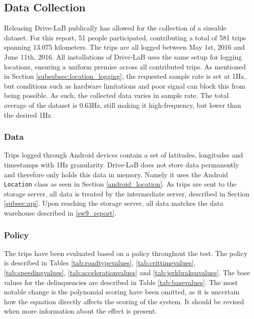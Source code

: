\subsection{Data Collection}\label{sec:datacollection}
Releasing Drive-LaB publically has allowed for the collection of a sizeable dataset. For this report, 51 people participated, contributing a total of 581 trips spanning 13.075 kilometers. The trips are all logged between May 1st, 2016 and June 11th, 2016. All installations of Drive-LaB uses the same setup for logging locations, ensuring a uniform premise across all contributed trips. As mentioned in Section \ref{subsubsec:location_logging}, the requested sample rate is set at 1Hz, but conditions such as hardware limitations and poor signal can block this from being possible. As such, the collected data varies in sample rate. The total average of the dataset is 0.63Hz, still making it high-frequency, but lower than the desired 1Hz.

\subsubsection{Data}\label{subsec:data}
Trips logged through Android devices contain a set of latitudes, longitudes and timestamps with 1Hz granularity. Drive-LaB does not store data permanently and therefore only holds this data in memory. Namely it uses the Android \texttt{Location} class as seen in Section \ref{android_location}. As trips are sent to the storage server, all data is treated by the intermediate server, described in Section \ref{subsec:api}. Upon reaching the storage server, all data matches the data warehouse described in \ref{sw9_report}. 

\subsubsection{Policy}\label{subsec:policy}
The trips have been evaluated based on a policy throughout the test. The policy is described in Tables \ref{tab:roadtypevalues}, \ref{tab:crittimevalues}, \ref{tab:speedingvalues}, \ref{tab:accelerationvalues} and \ref{tab:jerkbrakenvalues}. The base values for the delinquencies are described in Table \ref{tab:basevalues}. The most notable change is the polynomial scoring have been omitted, as it is uncertain how the equation directly affects the scoring of the system. It should be revised when more information about the effect is present.

